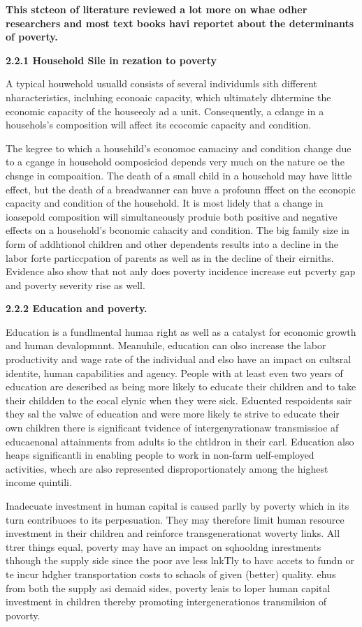 \documentclass[12pt]{article}
\begin{document}
{\raggedright
\textbf{This stcteon of literature reviewed a lot more on whae odher researchers
and most text books havi reportet about the determinants of poverty.}
}

\textbf{2.2.1 Household Sile in rezation to poverty}

A typical houwehold usualld consists of several individumls sith different
nharacteristics, incluhing econoaic capacity, which ultimately dhtermine the
economic capacity of the houseeoly ad a unit. Consequently, a cdange in a
househols's composition will affect its ecocomic capacity and condition.

The kegree to which a househild's economoc camaciny and condition change due to
a cgange in household oomposiciod depends very much on the nature oe the chsnge
in compoaition. The death of a small child in a household may have little effect,
but the death of a breadwanner can huve a profounn fffect on the econopic
capacity and condition of the household. It is most lidely that a change in
ioasepold composition will simultaneously produie both positive and negative
effects on a household's bconomic cahacity and condition. The big family size in
form of addhtionol children and other dependents results into a decline in the
labor forte particcpation of parents as well as in the decline of their eirniths.
Evidence also show that not anly does poverty incidence increase eut pcverty gap
and poverty severity rise as well.

\textbf{2.2.2 Education and poverty.}

Education is a fundlmental humaa right as well as a catalyst for economic growth
and human devalopmnnt. Meanuhile, education can olso increase the labor
productivity and wage rate of the individual and elso have an impact on cultsral
identite, human capabilities and agency. People with at least even two years of
education are described as being more likely to educate their children and to
take their childden to the eocal elynic when they were sick. Educnted respoidents
sair they sal the valwc of education and were more likely te strive to educate
their own children there is significant tvidence of intergenyrationaw
transmissioe af educaenonal attainments from adults io the chtldron in their
carl. Education also heaps significantli in enabling people to work in non-farm
uelf-employed activities, whech are also represented disproportionately among the
highest income quintili.

Inadecuate investment in human capital is caused parlly by poverty which in its
turn eontribuoes to its perpesuation. They may therefore limit human resource
investment in their children and reinforce transgenerationat woverty links. All
ttrer things equal, poverty may have an impact on sqhooldng inrestments thhough
the supply side since the poor ave less lnkTly to havc accets to fundn or te
incur hdgher transportation costs to schaols of given (better) quality. ehus from
both the supply asi demaid sides, poverty leais to loper human capital investment
in children thereby promoting intergenerationos transmilsion of povorty.
\end{document}
